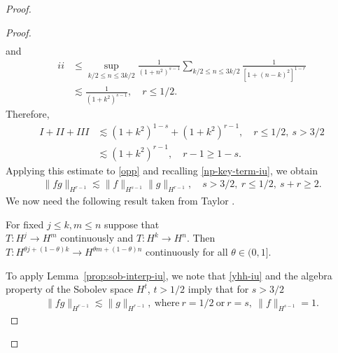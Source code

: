 \begin{proof}
\begin{proof}
\begin{equation*}
\begin{split}
\end{split}
\end{equation*}
%
and
%
%
\begin{equation*}
\begin{split}
ii & \le \sup_{k/2 \le n \le 3k/2} \frac{1}{\left( 1 + n^{2} \right)^{s-1}}
\sum_{k/2 \le n \le 3k/2} \frac{1}{[1 + (n-k)^{2}]^{1-r}} \\
& \lesssim \frac{1}{(1 + k^{2})^{s-1}}, \quad r \le 1/2.
\end{split}
\end{equation*}
%
%
Therefore, 
%
%
%
\begin{equation*}
\begin{split}
I + II + III & \lesssim (1 + k^{2})^{1-s} + (1 + k^{2})^{r-1}, \quad r \le 1/2, \ s > 3/2
\\
& \lesssim  (1 + k^{2})^{r-1}, \quad r -1 \ge 1-s.
\end{split}
\end{equation*}
%
Applying this estimate to \eqref{opp} and recalling \eqref{np-key-term-iu},
we obtain
%
%
%
%
\begin{equation}
\label{yhh-iu}
\begin{split}
\| f g \|_{H^{r-1}} \lesssim \| f \|_{H^{s-1}} \| g \|_{H^{r-1}},
\quad s > 3/2, \ r \le 1/2, \ s + r \ge 2.
\end{split}
\end{equation}
We now need the following result taken from Taylor \cite{Taylor:2011}.
%
%
%
%
%                
%
%
%
%
\begin{lemma}
For fixed $j \le k, m \le n$ suppose that \\ $T: H^{j} \to H^{m}$ continuously
and $T: H^{k} \to H^{n}$. Then\\ $T: H^{\theta j + (1 - \theta)k} \to H^{\theta
m + (1 - \theta) n}$ continuously for all $\theta \in (0,1]$.
\label{prop:sob-interp-iu}
\end{lemma}
%
To apply Lemma~\ref{prop:sob-interp-iu}, we note that \eqref{yhh-iu}
and the algebra property of the Sobolev space $H^{t}$, $t > 1/2$ imply that for $s > 3/2$
%
%
\begin{equation*}
\begin{split}
\| f g \|_{H^{r-1}} \lesssim \| g \|_{H^{r-1}}, \  \text{where} \ 
r=1/2 \ \text{or} \  r =s, \ \| f \|_{H^{s-1}} =1.
\end{split}
\end{equation*}

\end{proof}
\end{proof}
